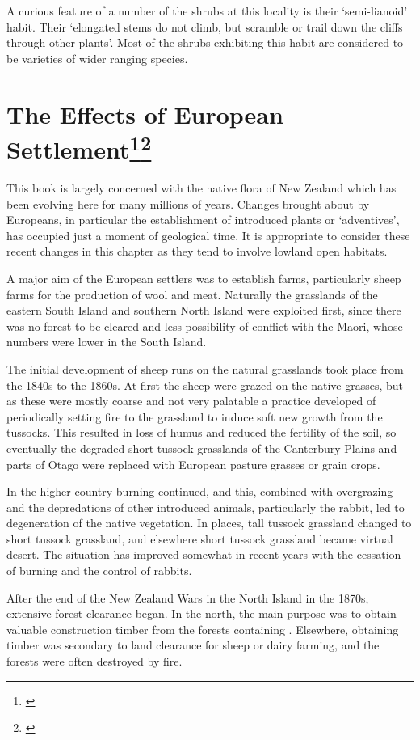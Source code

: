 A curious feature of a number of the shrubs at this locality is their `semi-lianoid' habit.
Their `elongated stems do not climb, but scramble or trail down the cliffs through other plants'.
Most of the shrubs exhibiting this habit are considered to be varieties of wider ranging species.

\section[The Effects of European Settlement]{The Effects of European Settlement\thinspace\footnote{\cite{healy1980flora}}\footnote{\cite{healy1969adventive}}}

This book is largely concerned with the native flora of New Zealand which has been evolving here for many millions of years.
Changes brought about by Europeans, in particular the establishment of introduced plants or `adventives', has occupied just a moment of geological time.
It is appropriate to consider these recent changes in this chapter as they tend to involve lowland open habitats.

A major aim of the European settlers was to establish farms, particularly sheep farms for the production of wool and meat.
Naturally the grasslands of the eastern South Island and southern North Island were exploited first, since there was no forest to be cleared and less possibility of conflict with the Maori, whose numbers were lower in the South Island.

The initial development of sheep runs on the natural grasslands took place from the 1840s to the 1860s.
At first the sheep were grazed on the native grasses, but as these were mostly coarse and not very palatable a practice developed of periodically setting fire to the grassland to induce soft new growth from the tussocks.
This resulted in loss of humus and reduced the fertility of the soil, so eventually the degraded short tussock grasslands of the Canterbury Plains and parts of Otago were replaced with European pasture grasses or grain crops.

In the higher country burning continued, and this, combined with overgrazing and the depredations of other introduced animals, particularly the rabbit, led to degeneration of the native vegetation.
In places, tall tussock grassland changed to short tussock grassland, and elsewhere short tussock grassland became virtual desert.
The situation has improved somewhat in recent years with the cessation of burning and the control of rabbits.

After the end of the New Zealand Wars in the North Island in the 1870s, extensive forest clearance began.
In the north, the main purpose was to obtain valuable construction timber from the forests containing .
Elsewhere, obtaining timber was secondary to land clearance for sheep or dairy farming, and the forests were often destroyed by fire.

